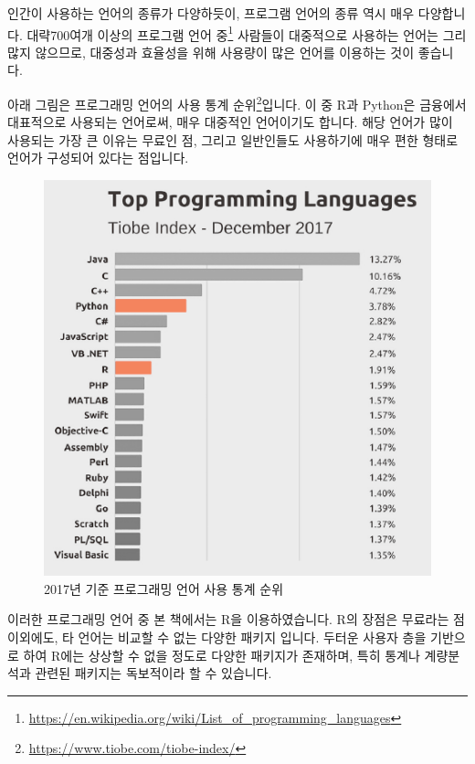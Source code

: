\documentclass[]{book}
\let\rmarkdownfootnote\footnote%
\def\footnote{\protect\rmarkdownfootnote}
\begin{document}
인간이 사용하는 언어의 종류가 다양하듯이, 프로그램 언어의 종류 역시 매우 다양합니다. 대략700여개 이상의 프로그램 언어 중\footnote{\url{https://en.wikipedia.org/wiki/List_of_programming_languages}} 사람들이 대중적으로 사용하는 언어는 그리 많지 않으므로, 대중성과 효율성을 위해 사용량이 많은 언어를 이용하는 것이 좋습니다.

아래 그림은 프로그래밍 언어의 사용 통계 순위\footnote{\url{https://www.tiobe.com/tiobe-index/}}입니다. 이 중 R과 Python은 금융에서 대표적으로 사용되는 언어로써, 매우 대중적인 언어이기도 합니다. 해당 언어가 많이 사용되는 가장 큰 이유는 무료인 점, 그리고 일반인들도 사용하기에 매우 편한 형태로 언어가 구성되어 있다는 점입니다.

\begin{figure}

{\centering \includegraphics{images/tiobe_index} 

}

\caption{2017년 기준 프로그래밍 언어 사용 통계 순위}\label{fig:unnamed-chunk-4}
\end{figure}

이러한 프로그래밍 언어 중 본 책에서는 R을 이용하였습니다. R의 장점은 무료라는 점 이외에도, 타 언어는 비교할 수 없는 다양한 패키지 입니다. 두터운 사용자 층을 기반으로 하여 R에는 상상할 수 없을 정도로 다양한 패키지가 존재하며, 특히 통계나 계량분석과 관련된 패키지는 독보적이라 할 수 있습니다.
\end{document}
